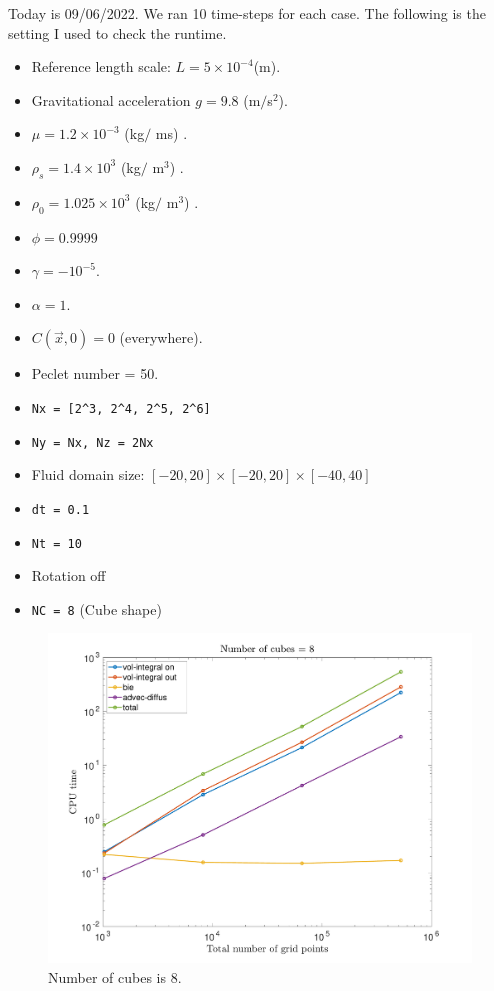 \clearpage
Today is 09/06/2022. We ran 10 time-steps for each case. The following is the setting I used to check the runtime. 
\begin{framed}
	\begin{itemize}
		\item Reference length scale: $L = 5 \times 10^{-4}$(m).
		\item Gravitational acceleration $g = 9.8$ (m$/$s$^2$).
		\item $\mu = 1.2 \times 10^{-3}$ (kg$/$ ms) .
		\item $\rho_s = 1.4 \times 10^{3}$ (kg$/$ m$^3$) .
		\item $\rho_0 = 1.025 \times 10^{3}$ (kg$/$ m$^3$) .
		\item $\phi = 0.9999$
		\item $\gamma = -10^{-5}$.
		\item $\alpha = 1$.
		\item $C(\vec{x}, 0) = 0$ (everywhere).
		\item Peclet number = 50.
		\\
		\item \verb+Nx = [2^3, 2^4, 2^5, 2^6]+
		\item \verb+Ny = Nx, Nz = 2Nx+
		\item Fluid domain size: $[-20, 20] \times [-20, 20] \times [-40, 40]$
		\item \verb+dt = 0.1+
		\item \verb+Nt = 10+
		\item Rotation off 
		\item \verb+NC = 8+ (Cube shape)
	\end{itemize}
\end{framed}
\begin{figure}[h]
	\begin{center}
		\vspace{0.5cm}
		\includegraphics[scale=0.3]{./figures/fig_10time_NC8_varNx}
	
	\caption{Number of cubes is 8. }
	\label{fig_10time_NC8_varNx}
\end{center}
\end{figure}

